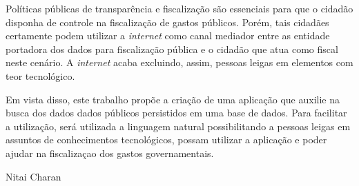 Políticas públicas de transparência e fiscalização são essenciais para que o cidadão disponha de controle na fiscalização de gastos públicos. Porém, tais cidadães certamente podem utilizar a \textit{internet} como canal mediador entre as entidade portadora dos dados para fiscalização pública e o cidadão que atua como fiscal neste cenário. A \textit{internet} acaba excluindo, assim, pessoas leigas em elementos com teor tecnológico.

Em vista disso, este trabalho propõe a criação de uma aplicação que auxilie na busca dos dados dados públicos persistidos em uma base de dados. Para facilitar a utilização, será utilizada a linguagem natural possibilitando a pessoas leigas em assuntos de conhecimentos tecnológicos, possam utilizar a aplicação e poder ajudar na fiscalizaçao dos gastos governamentais.

Nitai Charan
